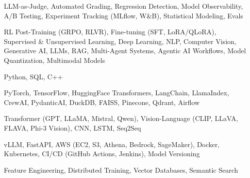 \documentclass[letter,10pt]{article}
\begin{document}
 LLM-as-Judge, Automated Grading, Regression Detection, Model Observability, A/B Testing, Experiment Tracking (MLflow, W\&B), Statistical Modeling, Evals\par\vspace{2pt}

 RL Post-Training (GRPO, RLVR), Fine-tuning (SFT, LoRA/QLoRA), Supervised \& Unsupervised Learning, Deep Learning, NLP, Computer Vision, Generative AI, LLMs, RAG, Multi-Agent Systems, Agentic AI Workflows, Model Quantization, Multimodal Models\par\vspace{2pt}

 Python, SQL, C++\par\vspace{2pt}

 PyTorch, TensorFlow, HuggingFace Transformers, LangChain, LlamaIndex, CrewAI, PydanticAI, DuckDB, FAISS, Pinecone, Qdrant, Airflow\par\vspace{2pt}

 Transformer (GPT, LLaMA, Mistral, Qwen), Vision-Language (CLIP, LLaVA, FLAVA, Phi-3 Vision), CNN, LSTM, Seq2Seq\par\vspace{2pt}

 vLLM, FastAPI, AWS (EC2, S3, Athena, Bedrock, SageMaker), Docker, Kubernetes, CI/CD (GitHub Actions, Jenkins), Model Versioning\par\vspace{2pt}

 Feature Engineering, Distributed Training, Vector Databases, Semantic Search
\end{document}

